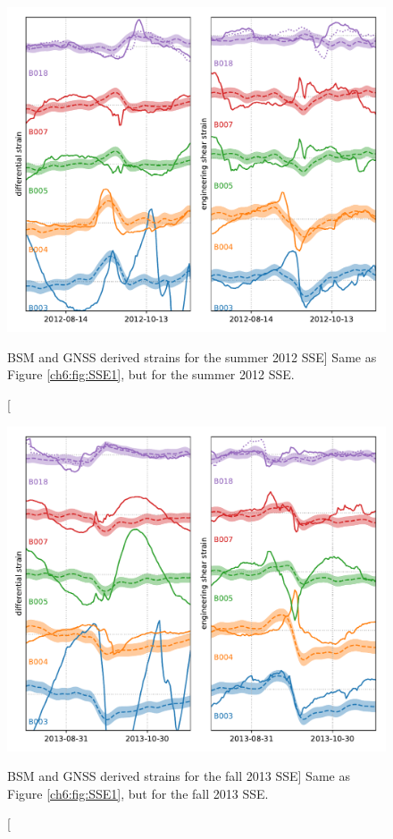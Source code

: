 \begin{figure}
\includegraphics{ch6/figures/SSE3.pdf}
\caption
[BSM and GNSS derived strains for the summer 2012 SSE]
{Same as Figure \ref{ch6:fig:SSE1}, but for the summer 2012 SSE.}   
\label{ch6:fig:SSE3}
\end{figure}

\begin{figure}
\includegraphics{ch6/figures/SSE4.pdf}
\caption
[BSM and GNSS derived strains for the fall 2013 SSE]
{Same as Figure \ref{ch6:fig:SSE1}, but for the fall 2013 SSE.}   
\label{ch6:fig:SSE4}
\end{figure}

